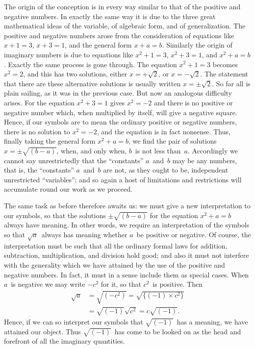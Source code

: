 \documentclass[12pt,leqno]{book}[2005/09/16]
\newcommand{\PageSep}[1]{\ignorespaces}
\begin{document}
The origin of the conception is in every
way similar to that of the positive and negative
numbers. In exactly the same way it
is due to the three great mathematical ideas
of the variable, of algebraic form, and of
generalization. The positive and negative
numbers arose from the consideration of
equations like $x + 1 = 3$, $x + 3 = 1$, and the
general form $x + a = b$. Similarly the origin
of imaginary numbers is due to equations like
$x^{2} + 1 = 3$, $x^{2} + 3 = 1$, and $x^{2} + a = b$. Exactly
the same process is gone through. The equation
$x^{2} + 1 = 3$ becomes $x^{2} = 2$, and this has two
solutions, either $x = +\sqrt{2}$, or $x = -\sqrt{2}$. The
statement that there are these alternative
\PageSep{89}
solutions is usually written $x = ±\sqrt{2}$. So far
all is plain sailing, as it was in the previous
case. But now an analogous difficulty arises.
For the equation $x^{2} + 3 = 1$ gives $x^{2} = -2$ and
there is no positive or negative number which,
when multiplied by itself, will give a negative
square. Hence, if our symbols are to mean
the ordinary positive or negative numbers,
there is no solution to $x^{2} = -2$, and the equation
is in fact nonsense. Thus, finally taking
the general form $x^{2} + a = b$, we find the pair
of solutions $x = ±\sqrt{(b - a)}$, when, and only
when, $b$~is not less than~$a$. Accordingly we
cannot say unrestrictedly that the ``constants''
$a$~and~$b$ may be any numbers, that is,
the ``constants'' $a$~and~$b$ are not, as they
ought to be, independent unrestricted ``variables'';
and so again a host of limitations
and restrictions will accumulate round our
work as we proceed.

The same task as before therefore awaits
us: we must give a new interpretation to our
symbols, so that the solutions $±\sqrt{(b -  a)}$ for
the equation $x^{2} + a = b$ always have meaning.
In other words, we require an interpretation
of the symbols so that $\sqrt{a}$~always has meaning
whether $a$~be positive or negative. Of
course, the interpretation must be such that
all the ordinary formal laws for addition, subtraction,
multiplication, and division hold
good; and also it must not interfere with the
\PageSep{90}
generality which we have attained by the use
of the positive and negative numbers. In
fact, it must in a sense include them as
special cases. When $a$~is negative we may
write $-c^{2}$ for it, so that $c^{2}$~is positive. Then
\begin{align*}
\sqrt{a} &= \sqrt{(-c^{2})} = \sqrt{\{(-1) × c^{2}\}} \\
  &= \sqrt{(-1)} \sqrt{c^{2}} = c\sqrt{(-1)}.
\end{align*}
Hence, if we can so interpret our symbols that
$\sqrt{(-1)}$~has a meaning, we have attained our
object. Thus $\sqrt{(-1)}$~has come to be looked
on as the head and forefront of all the
imaginary quantities.
\end{document}
